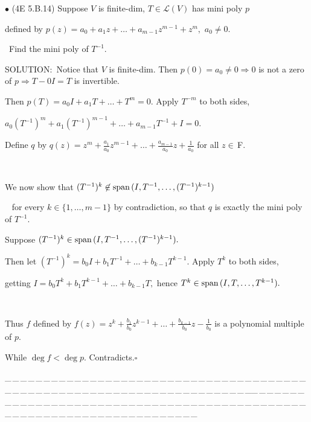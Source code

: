 \documentclass[a4paper, 11pt, UTF8]{article}
\def\Spn{\textup{span}\,}
\def\Lm{\mathcal{L}}
\def\Fbfc{$\,{\timesbf F}$}
\begin{document}
\begin{large}
{\small $\bullet$} ({\normalsize 4E 5.B.14}) {\timessl\Large 
Suppose $V$ is finite-dim, $T\in \Lm(V)$ has mini poly $p$}\par\centerline{\timessl\Large defined by $p(z)=a_0 + a_1 z + \dots + a_{m-1} z^{m-1}+z^m,$ $a_0\neq 0.$}\par\qquad\qquad\quad\,
{\timessl\Large Find the mini poly of $T^{-1}$.}\par
{\timesbf S\footnotesize{OLUTION:}}\,\,\,Notice that $V$ is finite-dim. Then $p(0)=a_0\neq 0\Rightarrow 0$ is not a zero of $p\Rightarrow T-0I=T$ is invertible.\par\quad
Then $p(T)=a_0 I+a_1 T+\dots+T^m=0.$ Apply $T^{-m}$ to both sides,\par\quad
$a_0(T^{-1})^m+a_1(T^{-1})^{m-1}+\dots+a_{m-1}T^{-1}+I=0.$\par\quad
Define $q$ by $\displaystyle q(z)=z^m+\frac{a_1}{a_0} z^{m-1}+\dots+\frac{a_{m-1}}{a_0}z+\frac{1}{a_0}$ for all $z\in\Fbfc.$\par{\tiny\,\par}\quad
We now show that $(T^{-1})^{k}\not\in\Spn(I,T^{-1},\dots,(T^{-1})^{k-1})$\par\qquad\qquad\qquad\,\,\,
for every $k\in\{1,\dots,m-1\}$ by contradiction, so that $q$ is exactly the mini poly of $T^{-1}.$\par\quad
Suppose $(T^{-1})^{k}\in\Spn(I,T^{-1},\dots,(T^{-1})^{k-1}).$\par\quad
Then let $(T^{-1})^{k}=b_0 I+b_1 T^{-1}+\dots+b_{k-1}T^{k-1}.$ Apply $T^k$ to both sides,\par\qquad\qquad
 getting $I=b_0 T^k+b_1 T^{k-1}+\dots+b_{k-1}T,$ hence $T^{k}\in\Spn(I,T,\dots,T^{k-1}).$\par{\tiny\,\par}\quad
Thus $f$ defined by $\displaystyle f(z)=z^k+\frac{b_1}{b_0} z^{k-1}+\dots+\frac{b_{k-1}}{b_0} z-\frac{1}{b_0}$ is a polynomial multiple of $p$.\par\quad
While $\deg f<\deg p.$ Contradicts.\quad$\square$\par
{\tiny \_\,\_\,\_\,\_\,\_\,\_\,\_\,\_\,\_\,\_\,\_\,\_\,\_\,\_\,\_\,\_\,\_\,\_\,\_\,\_\,\_\,\_\,\_\,\_\,\_\,\_\,\_\,\_\,\_\,\_\,\_\,\_\,\_\,\_\,\_\,\_\,\_\,\_\,\_\,\_\,\_\,\_\,\_\,\_\,\_\,\_\,\_\,\_\,\_\,\_\,\_\,\_\,\_\,\_\,\_\,\_\,\_\,\_\,\_\,\_\,\_\,\_\,\_\,\_\,\_\,\_\,\_\,\_\,\_\,\_\,\_\_\,\_\,\_\,\_\,\_\,\_\,\_\,\_\,\_\,\_\,\_\,\_\,\_\,\_\,\_\,\_\,\_\,\_\,\_\,\_\,\_\,\_\,\_\,\_\,\_\,\_\,\_\,\_\,\_\,\_\,\_\,\_\,\_\,\_\,\_\,\_\,\_\,\_\,\_\,\_\,\_\,\_\,\_\,\_\,\_\,\_\,\_\,\_\,\_\,\_\,\_\,\_\,\_\,\_\,\_\,\_\,\_\,\_\,\_\,\_\,\_\,\_\,\_\,\_\,\_\,\_\,\_\,\_\,\_\,\_\,\_}\par{\tiny\,\par}


\end{large}
\end{document}
